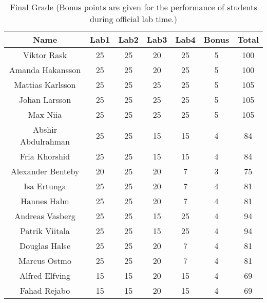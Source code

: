 \documentclass{article}
\begin{document}
\begin{table}[ht]
\caption{Final Grade (Bonus points are given for the performance of students during official lab time.)}
\centering
\begin{tabular}{c c c c c c c} 
\hline\hline 
Name & Lab1 & Lab2 & Lab3 & Lab4 & Bonus & Total \\ [0.5ex] 
\hline
Viktor Rask
& 25 & 25 & 20 & 25 & 5 & 100 \\
\hline
Amanda Hakansson 
& 25 & 25 & 20 & 25 & 5 & 100 \\
\hline
Mattias Karlsson
& 25 & 25 & 25 & 25 & 5 & 105 \\
\hline 
Johan Larsson
& 25 & 25 & 25 & 25 & 5 & 105 \\
\hline 
Max Niia
& 25 & 25 & 25 & 25 & 5 & 105 \\
\hline 
Abshir Abdulrahman
& 25 & 25 & 15 & 15 & 4 & 84 \\
\hline
Fria Khorshid
& 25 & 25 & 15 & 15 & 4 & 84 \\
\hline
Alexander Benteby
& 20 & 25 & 20 & 7 & 3 & 75 \\
\hline
Isa Ertunga
& 25 & 25 & 20 & 7 & 4 & 81 \\
\hline
Hannes Halm
& 25 & 25 & 20 & 7 & 4 & 81 \\
\hline 
Andreas Vasberg
& 25 & 25 & 15 & 25 & 4 & 94 \\
\hline 
Patrik Viitala
& 25 & 25 & 15 & 25 & 4 & 94 \\  
\hline
Douglas Halse
& 25 & 25 & 20 & 7 & 4 & 81 \\
\hline
Marcus Ostmo
& 25 & 25 & 20 & 7 & 4 & 81 \\ 
\hline
Alfred Elfving
& 15 & 15 & 20 & 15 & 4 & 69 \\
\hline
Fahad Rejabo
& 15 & 15 & 20 & 15 & 4 & 69 \\
\hline
\end{tabular}
\label{table:nonlin}
\end{table}
\end{document}
